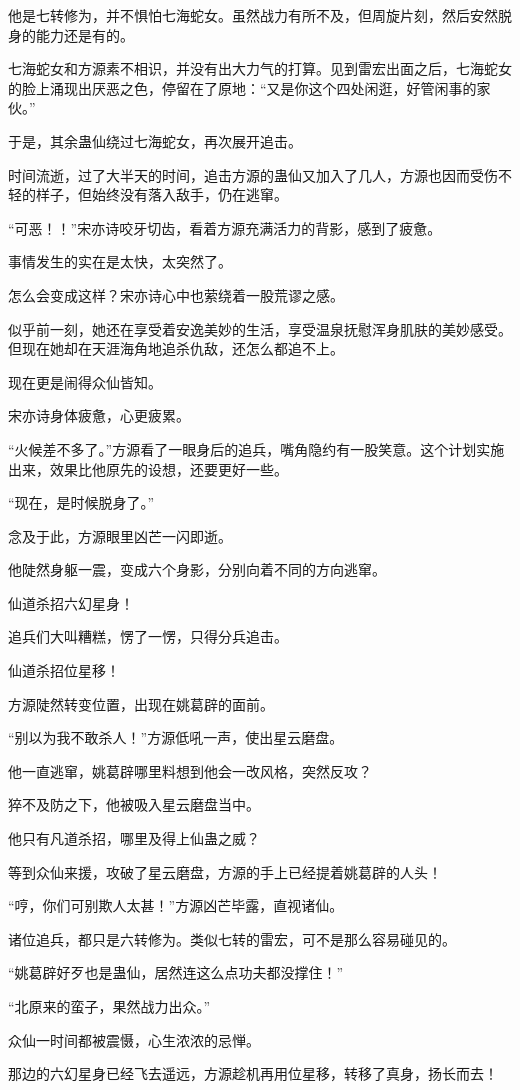 \begin{this_body}
他是七转修为，并不惧怕七海蛇女。虽然战力有所不及，但周旋片刻，然后安然脱身的能力还是有的。

七海蛇女和方源素不相识，并没有出大力气的打算。见到雷宏出面之后，七海蛇女的脸上涌现出厌恶之色，停留在了原地：“又是你这个四处闲逛，好管闲事的家伙。”

于是，其余蛊仙绕过七海蛇女，再次展开追击。

时间流逝，过了大半天的时间，追击方源的蛊仙又加入了几人，方源也因而受伤不轻的样子，但始终没有落入敌手，仍在逃窜。

“可恶！！”宋亦诗咬牙切齿，看着方源充满活力的背影，感到了疲惫。

事情发生的实在是太快，太突然了。

怎么会变成这样？宋亦诗心中也萦绕着一股荒谬之感。

似乎前一刻，她还在享受着安逸美妙的生活，享受温泉抚慰浑身肌肤的美妙感受。但现在她却在天涯海角地追杀仇敌，还怎么都追不上。

现在更是闹得众仙皆知。

宋亦诗身体疲惫，心更疲累。

“火候差不多了。”方源看了一眼身后的追兵，嘴角隐约有一股笑意。这个计划实施出来，效果比他原先的设想，还要更好一些。

“现在，是时候脱身了。”

念及于此，方源眼里凶芒一闪即逝。

他陡然身躯一震，变成六个身影，分别向着不同的方向逃窜。

仙道杀招六幻星身！

追兵们大叫糟糕，愣了一愣，只得分兵追击。

仙道杀招位星移！

方源陡然转变位置，出现在姚葛辟的面前。

“别以为我不敢杀人！”方源低吼一声，使出星云磨盘。

他一直逃窜，姚葛辟哪里料想到他会一改风格，突然反攻？

猝不及防之下，他被吸入星云磨盘当中。

他只有凡道杀招，哪里及得上仙蛊之威？

等到众仙来援，攻破了星云磨盘，方源的手上已经提着姚葛辟的人头！

“哼，你们可别欺人太甚！”方源凶芒毕露，直视诸仙。

诸位追兵，都只是六转修为。类似七转的雷宏，可不是那么容易碰见的。

“姚葛辟好歹也是蛊仙，居然连这么点功夫都没撑住！”

“北原来的蛮子，果然战力出众。”

众仙一时间都被震慑，心生浓浓的忌惮。

那边的六幻星身已经飞去遥远，方源趁机再用位星移，转移了真身，扬长而去！

\end{this_body}

